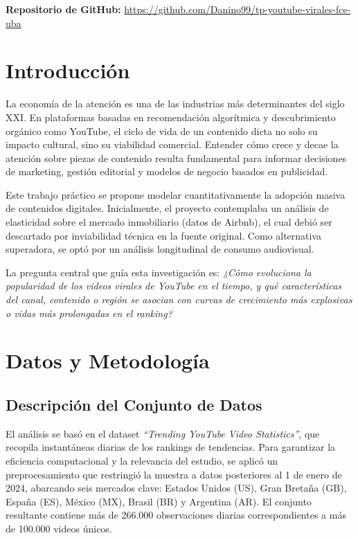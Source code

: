 \documentclass[12pt,a4paper]{article}
\begin{document}
\vspace{0.5cm}
\noindent\textbf{Repositorio de GitHub:} \url{https://github.com/Danino99/tp-youtube-virales-fce-uba}

\vspace{1cm}

\newpage

\section{Introducción}
La economía de la atención es una de las industrias más determinantes del siglo XXI. En plataformas basadas en recomendación algorítmica y descubrimiento orgánico como YouTube, el ciclo de vida de un contenido dicta no solo su impacto cultural, sino su viabilidad comercial. Entender cómo crece y decae la atención sobre piezas de contenido resulta fundamental para informar decisiones de marketing, gestión editorial y modelos de negocio basados en publicidad.

Este trabajo práctico se propone modelar cuantitativamente la adopción masiva de contenidos digitales. Inicialmente, el proyecto contemplaba un análisis de elasticidad sobre el mercado inmobiliario (datos de Airbnb), el cual debió ser descartado por inviabilidad técnica en la fuente original. Como alternativa superadora, se optó por un análisis longitudinal de consumo audiovisual.

La pregunta central que guía esta investigación es: \textit{¿Cómo evoluciona la popularidad de los videos virales de YouTube en el tiempo, y qué características del canal, contenido o región se asocian con curvas de crecimiento más explosivas o vidas más prolongadas en el ranking?}

\section{Datos y Metodología}
\subsection{Descripción del Conjunto de Datos}
El análisis se basó en el dataset \textit{``Trending YouTube Video Statistics''}, que recopila instantáneas diarias de los rankings de tendencias. Para garantizar la eficiencia computacional y la relevancia del estudio, se aplicó un preprocesamiento que restringió la muestra a datos posteriores al 1 de enero de 2024, abarcando seis mercados clave: Estados Unidos (US), Gran Bretaña (GB), España (ES), México (MX), Brasil (BR) y Argentina (AR). El conjunto resultante contiene más de 266.000 observaciones diarias correspondientes a más de 100.000 videos únicos.
\end{document}
